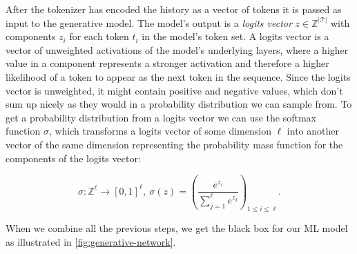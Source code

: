 After the tokenizer has encoded the history as a vector of tokens it is passed as input to the generative model.
The model's output is a \emph{logits vector} $z \in \mathbb{Z}^{|\mathcal{T}|}$ with components $z_i$ for each token $t_i$ in the model's token set.
A logits vector is a vector of unweighted activations of the model's underlying layers, where a higher value in a component represents a stronger activation and therefore a higher likelihood of a token to appear as the next token in the sequence.
Since the logits vector is unweighted, it might contain positive and negative values, which don't sum up nicely as they would in a probability distribution we can sample from.
To get a probability distribution from a logits vector we can use the softmax function $\sigma$, which transforms a logits vector of some dimension $\ell$ into another vector of the same dimension representing the probability mass function for the components of the logits vector:

$$\sigma \colon \mathbb{Z}^{\ell} \rightarrow [0,1]^{\ell},~ \sigma(z) = \left(\frac{e^{z_i}}{\sum_{j=1}^{\ell} e^{z_j}}\right)_{1 \leq i \leq \ell}.$$

When we combine all the previous steps, we get the black box for our ML model as illustrated in \autoref{fig:generative-network}.

